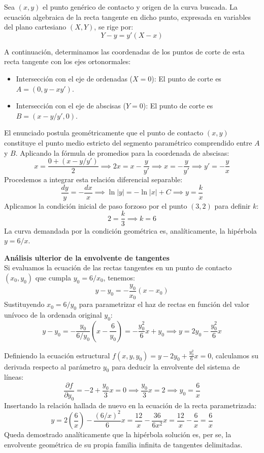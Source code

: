 \documentclass[11pt,a4paper]{article}
\theoremstyle{definition}
\theoremstyle{plain}
\begin{document}
\begin{tcolorbox}
Sea $(x,y)$ el punto genérico de contacto y origen de la curva buscada. La ecuación algebraica de la recta tangente en dicho punto, expresada en variables del plano cartesiano $(X, Y)$, se rige por:
$$ Y - y = y'(X - x) $$

A continuación, determinamos las coordenadas de los puntos de corte de esta recta tangente con los ejes ortonormales:
\begin{itemize}
    \item Intersección con el eje de ordenadas ($X = 0$): El punto de corte es $A = (0, y - xy')$.
    \item Intersección con el eje de abscisas ($Y = 0$): El punto de corte es $B = (x - y/y', 0)$.
\end{itemize}

El enunciado postula geométricamente que el punto de contacto $(x,y)$ constituye el punto medio estricto del segmento paramétrico comprendido entre $A$ y $B$. Aplicando la fórmula de promedios para la coordenada de abscisas:
$$ x = \frac{0 + (x - y/y')}{2} \implies 2x = x - \frac{y}{y'} \implies x = -\frac{y}{y'} \implies y' = -\frac{y}{x} $$
Procedemos a integrar esta relación diferencial separable:
$$ \frac{dy}{y} = -\frac{dx}{x} \implies \ln|y| = -\ln|x| + C \implies y = \frac{k}{x} $$
Aplicamos la condición inicial de paso forzoso por el punto $(3, 2)$ para definir $k$:
$$ 2 = \frac{k}{3} \implies k = 6 $$
La curva demandada por la condición geométrica es, analíticamente, la hipérbola $y = 6/x$.

\textbf{Análisis ulterior de la envolvente de tangentes}
\\
Si evaluamos la ecuación de las rectas tangentes en un punto de contacto $(x_0, y_0)$ que cumpla $y_0 = 6/x_0$, tenemos:
$$ y - y_0 = -\frac{y_0}{x_0}(x - x_0) $$
Sustituyendo $x_0 = 6/y_0$ para parametrizar el haz de rectas en función del valor unívoco de la ordenada original $y_0$:
$$ y - y_0 = -\frac{y_0}{6/y_0}\left(x - \frac{6}{y_0}\right) = -\frac{y_0^2}{6}x + y_0 \implies y = 2y_0 - \frac{y_0^2}{6}x $$

Definiendo la ecuación estructural $f(x,y,y_0) = y - 2y_0 + \frac{y_0^2}{6}x = 0$, calculamos su derivada respecto al parámetro $y_0$ para deducir la envolvente del sistema de líneas:
$$ \frac{\partial f}{\partial y_0} = -2 + \frac{y_0}{3}x = 0 \implies \frac{y_0}{3}x = 2 \implies y_0 = \frac{6}{x} $$
Insertando la relación hallada de nuevo en la ecuación de la recta parametrizada:
$$ y = 2\left(\frac{6}{x}\right) - \frac{(6/x)^2}{6}x = \frac{12}{x} - \frac{36}{6x^2}x = \frac{12}{x} - \frac{6}{x} = \frac{6}{x} $$
Queda demostrado analíticamente que la hipérbola solución es, per se, la envolvente geométrica de su propia familia infinita de tangentes delimitadas.


\end{tcolorbox}
\end{document}
